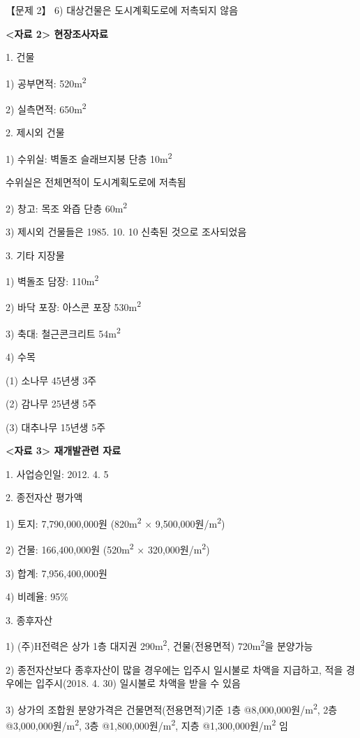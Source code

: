 \begin{longquestion}{【문제 2】}
6) 대상건물은 도시계획도로에 저촉되지 않음 \par
\textbf{<자료 2> 현장조사자료} \par
1. 건물 \par
1) 공부면적: 520m\textsuperscript{2} \par
2) 실측면적: 650m\textsuperscript{2} \par
2. 제시외 건물 \par
1) 수위실: 벽돌조 슬래브지붕 단층 10m\textsuperscript{2} \par
수위실은 전체면적이 도시계획도로에 저촉됨 \par
2) 창고: 목조 와즙 단층 60m\textsuperscript{2} \par
3) 제시외 건물들은 1985. 10. 10 신축된 것으로 조사되었음 \par
3. 기타 지장물 \par
1) 벽돌조 담장: 110m\textsuperscript{2} \par
2) 바닥 포장: 아스콘 포장 530m\textsuperscript{2} \par
3) 축대: 철근콘크리트 54m\textsuperscript{2} \par
4) 수목 \par
\medskip\noindent (1) 소나무 45년생 3주 \par
\medskip\noindent (2) 감나무 25년생 5주 \par
\medskip\noindent (3) 대추나무 15년생 5주 \par
\textbf{<자료 3> 재개발관련 자료} \par
1. 사업승인일: 2012. 4. 5 \par
2. 종전자산 평가액 \par
1) 토지: 7,790,000,000원 (820m\textsuperscript{2} × 9,500,000원/m\textsuperscript{2}) \par
2) 건물: 166,400,000원 (520m\textsuperscript{2} × 320,000원/m\textsuperscript{2}) \par
3) 합계: 7,956,400,000원 \par
4) 비례율: 95\% \par
3. 종후자산 \par
1) (주)H전력은 상가 1층 대지권 290m\textsuperscript{2}, 건물(전용면적) 720m\textsuperscript{2}을 분양가능 \par
2) 종전자산보다 종후자산이 많을 경우에는 입주시 일시불로 차액을 지급하고, 적을 경우에는 입주시(2018. 4. 30) 일시불로 차액을 받을 수 있음 \par
3) 상가의 조합원 분양가격은 건물면적(전용면적)기준 1층 @8,000,000원/m\textsuperscript{2}, 2층 @3,000,000원/m\textsuperscript{2}, 3층 @1,800,000원/m\textsuperscript{2}, 지층 @1,300,000원/m\textsuperscript{2} 임 \par

\end{longquestion}
